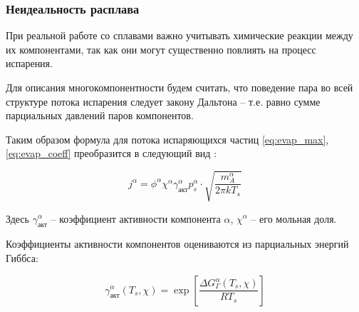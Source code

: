\subsubsection{Неидеальность расплава}

При реальной работе со сплавами важно учитывать химические реакции между их компонентами, так как они могут существенно повлиять на процесс испарения.

Для описания многокомпонентности будем считать, что поведение пара во всей структуре потока испарения следует закону Дальтона -- т.е. равно сумме парциальных давлений паров компонентов.

Таким образом формула для потока испаряющихся частиц \ref{eq:evap_max}, \ref{eq:evap_coeff} преобразится в следующий вид \cite{klassen2018simulation}:

\begin{equation}
\label{eq:evap_multicomp_flow}
    j^{\alpha} = \phi^\alpha\chi^\alpha\gamma_{\text{акт}}^\alpha p^{\alpha}_s \cdot \sqrt{\frac{m_A^\alpha}{2\pi k T_s}}
\end{equation}

Здесь $\gamma_{\text{акт}}^\alpha$ -- коэффициент активности компонента $\alpha$, $\chi^\alpha$ -- его мольная доля.

Коэффициенты активности компонентов оцениваются из парциальных энергий Гиббса:

\begin{equation}
    \gamma_{\text{акт}}^\alpha(T_s, \chi) = \exp\left[ \frac{\Delta G^\alpha_\Gamma (T_s, \chi)}{RT_s} \right]
\end{equation}

